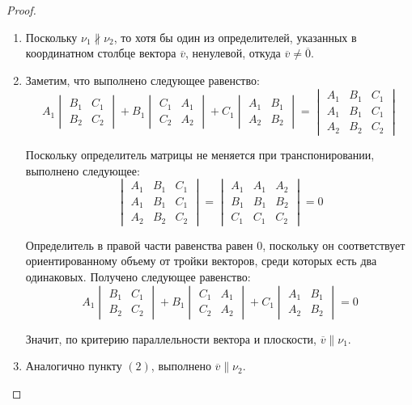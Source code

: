     \begin{proof}~
    	\begin{enumerate}
    		\item Поскольку $\nu_1 \nparallel \nu_2$, то хотя бы один из определителей, указанных в координатном столбце вектора $\overline{v}$, ненулевой, откуда $\overline v \ne \overline 0$.
    		\item Заметим, что выполнено следующее равенство:
    		\[A_1\begin{vmatrix}B_1&C_1\\B_2&C_2\end{vmatrix}+
    		B_1\begin{vmatrix}C_1&A_1\\C_2&A_2\end{vmatrix}+
    		C_1\begin{vmatrix}A_1&B_1\\A_2&B_2\end{vmatrix} = 
    		\begin{vmatrix}A_1&B_1&C_1\\A_1&B_1&C_1\\A_2&B_2&C_2\end{vmatrix}\]
    		
    		Поскольку определитель матрицы не меняется при транспонировании, выполнено следующее:
    		\[\begin{vmatrix}A_1&B_1&C_1\\A_1&B_1&C_1\\A_2&B_2&C_2\end{vmatrix} = \begin{vmatrix}A_1&A_1&A_2\\B_1&B_1&B_2\\C_1&C_1&C_2\end{vmatrix} = 0\]
    		
    		Определитель в правой части равенства равен $0$, поскольку он соответствует ориентированному объему от тройки векторов, среди которых есть два одинаковых. Получено следующее равенство:
    		\[A_1\begin{vmatrix}B_1&C_1\\B_2&C_2\end{vmatrix}+
    		B_1\begin{vmatrix}C_1&A_1\\C_2&A_2\end{vmatrix}+
    		C_1\begin{vmatrix}A_1&B_1\\A_2&B_2\end{vmatrix} = 0\]
    		
    		Значит, по критерию параллельности вектора и плоскости, $\overline{v} \parallel \nu_1$.
    		\item Аналогично пункту $(2)$, выполнено $\overline{v} \parallel \nu_2$.\qedhere
    	\end{enumerate}
    \end{proof}
    
